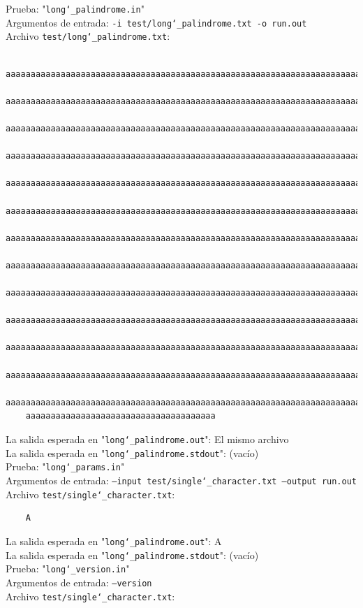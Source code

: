 \documentclass[a4paper,10pt]{article}
\begin{document}
    Prueba: "\texttt{long\char`_palindrome.in}" \\
    Argumentos de entrada: \texttt{-i test/long\char`_palindrome.txt -o run.out}\\
    Archivo \texttt{test/long\char`_palindrome.txt}: \\
    \begin{Verbatim}
    aaaaaaaaaaaaaaaaaaaaaaaaaaaaaaaaaaaaaaaaaaaaaaaaaaaaaaaaaaaaaaaaaaaaaaaaaa
    aaaaaaaaaaaaaaaaaaaaaaaaaaaaaaaaaaaaaaaaaaaaaaaaaaaaaaaaaaaaaaaaaaaaaaaaaa
    aaaaaaaaaaaaaaaaaaaaaaaaaaaaaaaaaaaaaaaaaaaaaaaaaaaaaaaaaaaaaaaaaaaaaaaaaa
    aaaaaaaaaaaaaaaaaaaaaaaaaaaaaaaaaaaaaaaaaaaaaaaaaaaaaaaaaaaaaaaaaaaaaaaaaa
    aaaaaaaaaaaaaaaaaaaaaaaaaaaaaaaaaaaaaaaaaaaaaaaaaaaaaaaaaaaaaaaaaaaaaaaaaa
    aaaaaaaaaaaaaaaaaaaaaaaaaaaaaaaaaaaaaaaaaaaaaaaaaaaaaaaaaaaaaaaaaaaaaaaaaa
    aaaaaaaaaaaaaaaaaaaaaaaaaaaaaaaaaaaaaaaaaaaaaaaaaaaaaaaaaaaaaaaaaaaaaaaaaa
    aaaaaaaaaaaaaaaaaaaaaaaaaaaaaaaaaaaaaaaaaaaaaaaaaaaaaaaaaaaaaaaaaaaaaaaaaa
    aaaaaaaaaaaaaaaaaaaaaaaaaaaaaaaaaaaaaaaaaaaaaaaaaaaaaaaaaaaaaaaaaaaaaaaaaa
    aaaaaaaaaaaaaaaaaaaaaaaaaaaaaaaaaaaaaaaaaaaaaaaaaaaaaaaaaaaaaaaaaaaaaaaaaa
    aaaaaaaaaaaaaaaaaaaaaaaaaaaaaaaaaaaaaaaaaaaaaaaaaaaaaaaaaaaaaaaaaaaaaaaaaa
    aaaaaaaaaaaaaaaaaaaaaaaaaaaaaaaaaaaaaaaaaaaaaaaaaaaaaaaaaaaaaaaaaaaaaaaaaa
    aaaaaaaaaaaaaaaaaaaaaaaaaaaaaaaaaaaaaaaaaaaaaaaaaaaaaaaaaaaaaaaaaaaaaaaaaa
    aaaaaaaaaaaaaaaaaaaaaaaaaaaaaaaaaaaaaa
    \end{Verbatim}
    La salida esperada en "\texttt{long\char`_palindrome.out}": El mismo archivo\\
    La salida esperada en "\texttt{long\char`_palindrome.stdout}": (vacío)\\
  
      Prueba: "\texttt{long\char`_params.in}" \\
    Argumentos de entrada: \texttt{--input test/single\char`_character.txt --output run.out}\\
    Archivo \texttt{test/single\char`_character.txt}: \\
    \begin{Verbatim}
    A
    \end{Verbatim}
    La salida esperada en "\texttt{long\char`_palindrome.out}": A\\
    La salida esperada en "\texttt{long\char`_palindrome.stdout}": (vacío)\\
  
        Prueba: "\texttt{long\char`_version.in}" \\
    Argumentos de entrada: \texttt{--version}\\
    Archivo \texttt{test/single\char`_character.txt}: \\
\end{document}
